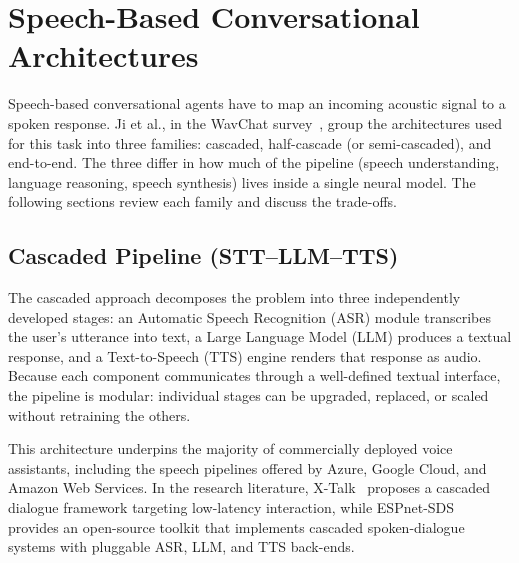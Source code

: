 
\section{Speech-Based Conversational Architectures}
\label{sec:speech-architectures}

Speech-based conversational agents have to map an incoming acoustic signal
to a spoken response. Ji et al., in the WavChat survey~\cite{ji2024wavechat},
group the architectures used for this task into three families: cascaded,
half-cascade (or semi-cascaded), and end-to-end. The three differ in how
much of the pipeline (speech understanding, language reasoning, speech
synthesis) lives inside a single neural model. The following sections
review each family and discuss the trade-offs.

\subsection{Cascaded Pipeline (STT--LLM--TTS)}
\label{subsec:cascaded}

The cascaded approach decomposes the problem into three independently
developed stages: an Automatic Speech Recognition (ASR) module transcribes
the user's utterance into text, a Large Language Model (LLM) produces a
textual response, and a Text-to-Speech (TTS) engine renders that response
as audio. Because each component communicates through a well-defined
textual interface, the pipeline is modular: individual stages can be
upgraded, replaced, or scaled without retraining the others.

This architecture underpins the majority of commercially deployed voice
assistants, including the speech pipelines offered by Azure, Google Cloud,
and Amazon Web Services. In the research literature,
X-Talk~\cite{lin2025xtalk} proposes a cascaded dialogue framework targeting
low-latency interaction, while ESPnet-SDS~\cite{li2025espnetsds} provides
an open-source toolkit that implements cascaded spoken-dialogue systems
with pluggable ASR, LLM, and TTS back-ends.

